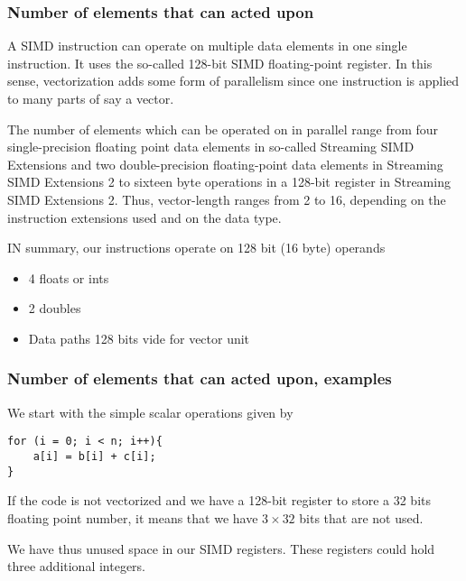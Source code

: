 \documentclass{beamer}
\begin{document}
\begin{frame}
\frametitle{Number of elements that can acted upon}

A SIMD instruction can operate  on multiple data elements in one single instruction.
It uses the so-called 128-bit SIMD floating-point register. 
In this sense, vectorization adds some form of parallelism since one instruction is applied  
to many parts of say a vector.

The number of elements which can be operated on in parallel
range from four single-precision floating point data elements in so-called 
Streaming SIMD Extensions and two double-precision floating-point data
elements in Streaming SIMD Extensions 2 to sixteen byte operations in
a 128-bit register in Streaming SIMD Extensions 2. Thus, vector-length
ranges from 2 to 16, depending on the instruction extensions used and
on the data type. 

IN summary, our instructions  operate on 128 bit (16 byte) operands
\begin{itemize}
\item 4 floats or ints

\item 2 doubles

\item Data paths 128 bits vide for vector unit
\end{itemize}

\noindent
\end{frame}

\begin{frame}
\frametitle{Number of elements that can acted upon, examples}

We start with the simple scalar operations given by




\begin{verbatim}
for (i = 0; i < n; i++){
    a[i] = b[i] + c[i];
}

\end{verbatim}

If the code is not vectorized  and we have a 128-bit register to store a 32 bits floating point number,
it means that we have $3\times 32$ bits that are not used. 

We have thus unused space in our SIMD registers. These registers could hold three additional integers.
\end{frame}
\end{document}
